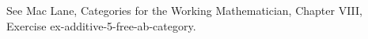 See Mac Lane, Categories for the Working Mathematician, Chapter VIII, Exercise ex-additive-5-free-ab-category.
